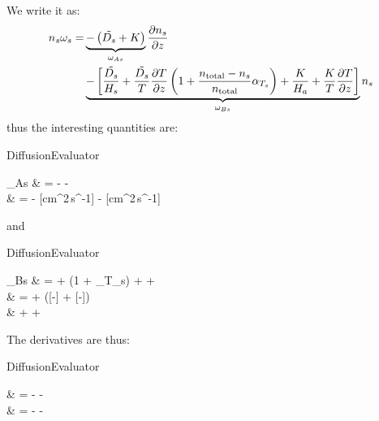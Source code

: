 We write it as:
\begin{equation}
\begin{split}
n_s\omega_s = & \underbrace{- \left( \tilde{D_s} + K \right)}_{\omega_{As}} \frac{\partial n_s}{\partial z} \\
                  & \underbrace{- \left[
                                    \frac{\tilde{D_s}}{H_s} + \frac{\tilde{D_s}}{T}\frac{\partial T}{\partial z}\left(1 + \frac{n_\text{total} - n_s}{n_\text{total}}\alpha_{T_s}\right)
                                  + \frac{K}{H_a} + \frac{K}{T}\frac{\partial T}{\partial z}
                    \right]}_{\omega_{Bs}}n_s \\
\end{split}
\end{equation}
thus the interesting quantities are:
\begin{equationCode}{DiffusionEvaluator}
\begin{split}
\omega_{As} &  = - - \eddy \\[5pt]
\uu [cm^2\,s^{-1}] & \uu = - [cm^2\,s^{-1}] - [cm^2\,s^{-1}]
\end{split}
\end{equationCode}
and
\begin{equationCode}{DiffusionEvaluator}
\begin{split}
\omega_{Bs} & =  + \left(1 + \thermcoef_{T_s}\right)
                               +  +  \\[5pt]
\uu [cm^2\,s^{-1}\,km^{-1}] & \uu = \frac{[cm^2\,s^{-1}]}{[km]} + \frac{[cm^2\,s^{-1}]}{[K]}\frac{[K]}{[km]}\left([-] + \frac{[cm^{-3}] - [cm^{-3}]}{[cm^{-3}]}[-]\right) \\
                            & \uu \fakeequalspace   + \frac{[cm^2\,s^{-1}]}{[km]} + \frac{[cm^2\,s^{-1}]}{[K]}\frac{[K]}{[km]}
\end{split}
\end{equationCode}
The derivatives are thus:
\begin{equationCode}{DiffusionEvaluator}
\begin{split}
 & = - -   \\
\uu \frac{[cm^2\,s^{-1}]}{[cm^{-3}]} & \uu = - \frac{[cm^2\,s^{-1}]}{[cm^{-3}]} - \frac{[cm^2\,s^{-1}]}{[cm^{-3}]}
\end{split}
\end{equationCode}
